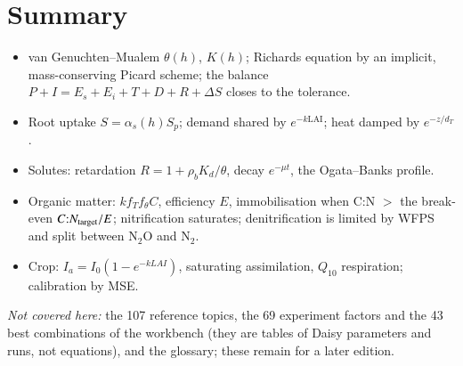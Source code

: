 \section{Summary}
\begin{itemize}
\item van Genuchten--Mualem $\theta(h)$, $K(h)$; Richards equation by an implicit, mass-conserving Picard scheme; the balance $P+I=E_s+E_i+T+D+R+\Delta S$ closes to the tolerance.
\item Root uptake $S=\alpha_s(h)S_p$; demand shared by $e^{-k\mathrm{LAI}}$; heat damped by $e^{-z/d_T}$.
\item Solutes: retardation $R=1+\rho_bK_d/\theta$, decay $e^{-\mu t}$, the Ogata--Banks profile.
\item Organic matter: $k f_Tf_\theta C$, efficiency $E$, immobilisation when C:N $>$ the break-even $C{:}N_{\rm target}/E$; nitrification saturates; denitrification is limited by WFPS and split between N$_2$O and N$_2$.
\item Crop: $I_a=I_0(1-e^{-kLAI})$, saturating assimilation, $Q_{10}$ respiration; calibration by MSE.
\end{itemize}
\textit{Not covered here:} the 107 reference topics, the 69 experiment factors and the 43 best combinations of the workbench (they are tables of Daisy parameters and runs, not equations), and the glossary; these remain for a later edition.
